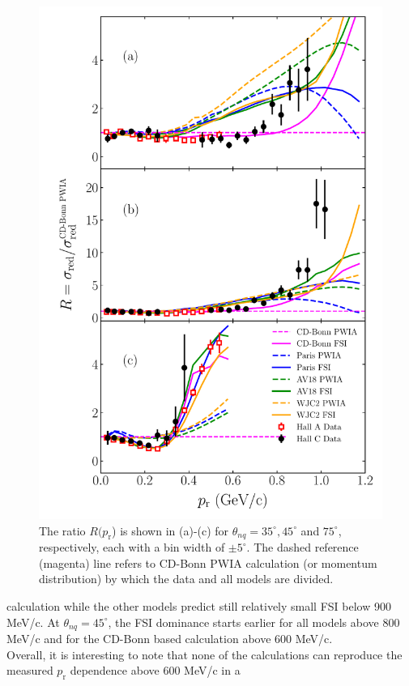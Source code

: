 \begin{figure}[!t]
\includegraphics[scale=0.5]{./prl_plots/PRL_plot2_WJC2.pdf}
\caption{The ratio $R(p_{\mathrm{r}}$) is shown in (a)-(c) for $\theta_{nq}=35^{\circ}, 45^{\circ}$ and $75^{\circ}$, respectively, each with a bin width of $\pm 5^{\circ}$.
The dashed reference (magenta) line refers to CD-Bonn PWIA calculation (or momentum distribution) by which the data and all models are divided.}
\label{fig:fig2}
\end{figure}
calculation while the other models predict still relatively small FSI below 900 MeV/c.
At $\theta_{nq}=45^{\circ}$, the FSI dominance starts earlier for all models above 800 MeV/c and for the CD-Bonn based calculation above 600 MeV/c. \\
\indent Overall, it is interesting to note that none of the calculations can reproduce the measured $p_{\mathrm{r}}$ dependence above 600 MeV/c in a
